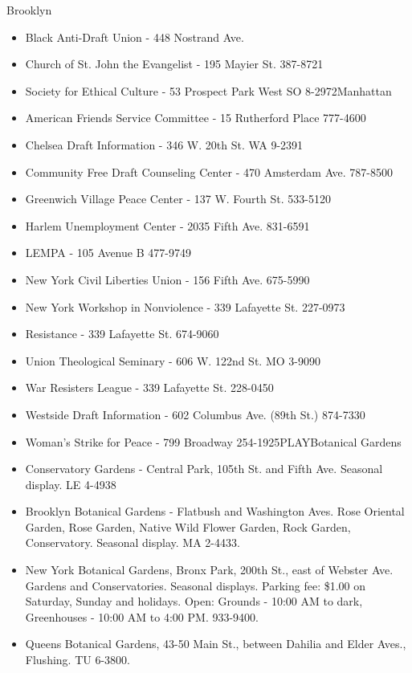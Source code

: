 \documentclass[11pt,twoside,a4paper]{book}
\begin{document}
Brooklyn 
\begin{itemize}\item Black Anti-Draft Union - 448 Nostrand Ave. 
\item Church of St. John the Evangelist - 195 Mayier St. 387-8721 
\item Society for Ethical Culture - 53 Prospect Park West SO 8-2972Manhattan 
\item American Friends Service Committee - 15 Rutherford Place 777-4600 
\item Chelsea Draft Information - 346 W. 20th St. WA 9-2391 
\item Community Free Draft Counseling Center - 470 Amsterdam Ave. 787-8500 
\item Greenwich Village Peace Center - 137 W. Fourth St. 533-5120 
\item Harlem Unemployment Center - 2035 Fifth Ave. 831-6591 
\item LEMPA - 105 Avenue B 477-9749 
\item New York Civil Liberties Union - 156 Fifth Ave. 675-5990 
\item New York Workshop in Nonviolence - 339 Lafayette St. 227-0973 
\item Resistance - 339 Lafayette St. 674-9060 
\item Union Theological Seminary - 606 W. 122nd St. MO 3-9090 
\item War Resisters League - 339 Lafayette St. 228-0450 
\item Westside Draft Information - 602 Columbus Ave. (89th St.) 874-7330 
\item Woman's Strike for Peace - 799 Broadway 254-1925PLAYBotanical Gardens 
\item Conservatory Gardens - Central Park, 105th St. and Fifth Ave. Seasonal display. LE 4-4938 
\item Brooklyn Botanical Gardens - Flatbush and Washington Aves. Rose Oriental Garden, Rose Garden, Native Wild Flower Garden, Rock Garden, Conservatory. Seasonal display. MA 2-4433.
\item New York Botanical Gardens, Bronx Park, 200th St., east of Webster Ave. Gardens and Conservatories. Seasonal displays. Parking fee: \$1.00 on Saturday, Sunday and holidays. Open: Grounds - 10:00 AM to dark, Greenhouses - 10:00 AM to 4:00 PM. 933-9400. 
\item Queens Botanical Gardens, 43-50 Main St., between Dahilia and Elder Aves., Flushing. TU 6-3800.~\\
\end{itemize}
\end{document}
